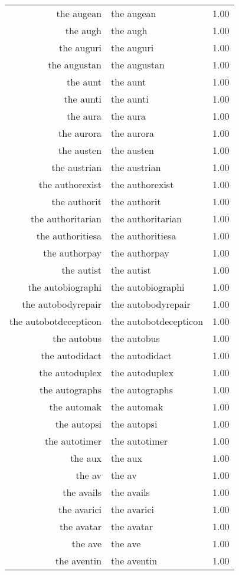 \begin{table}[ht]
\begin{tabular}{rlr}
  the augean & the augean & 1.00 \\ 
  the augh & the augh & 1.00 \\ 
  the auguri & the auguri & 1.00 \\ 
  the augustan & the augustan & 1.00 \\ 
  the aunt & the aunt & 1.00 \\ 
  the aunti & the aunti & 1.00 \\ 
  the aura & the aura & 1.00 \\ 
  the aurora & the aurora & 1.00 \\ 
  the austen & the austen & 1.00 \\ 
  the austrian & the austrian & 1.00 \\ 
  the authorexist & the authorexist & 1.00 \\ 
  the authorit & the authorit & 1.00 \\ 
  the authoritarian & the authoritarian & 1.00 \\ 
  the authoritiesa & the authoritiesa & 1.00 \\ 
  the authorpay & the authorpay & 1.00 \\ 
  the autist & the autist & 1.00 \\ 
  the autobiographi & the autobiographi & 1.00 \\ 
  the autobodyrepair & the autobodyrepair & 1.00 \\ 
  the autobotdecepticon & the autobotdecepticon & 1.00 \\ 
  the autobus & the autobus & 1.00 \\ 
  the autodidact & the autodidact & 1.00 \\ 
  the autoduplex & the autoduplex & 1.00 \\ 
  the autographs & the autographs & 1.00 \\ 
  the automak & the automak & 1.00 \\ 
  the autopsi & the autopsi & 1.00 \\ 
  the autotimer & the autotimer & 1.00 \\ 
  the aux & the aux & 1.00 \\ 
  the av & the av & 1.00 \\ 
  the avails & the avails & 1.00 \\ 
  the avarici & the avarici & 1.00 \\ 
  the avatar & the avatar & 1.00 \\ 
  the ave & the ave & 1.00 \\ 
  the aventin & the aventin & 1.00 \\ 

\end{tabular}
\end{table}
